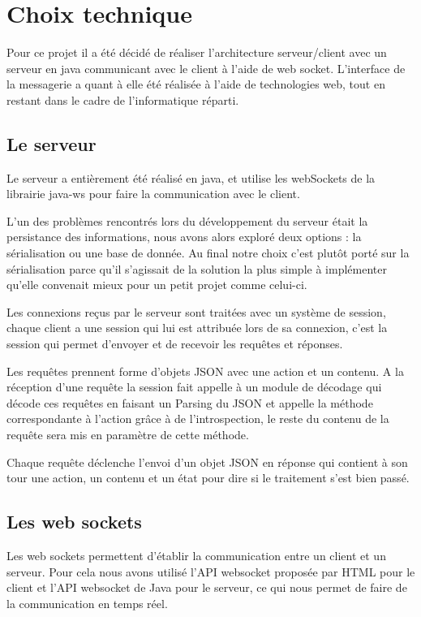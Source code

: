 \section{Choix technique}

\par Pour ce projet il a été décidé de réaliser l'architecture serveur/client avec un serveur en java communicant avec le client à l'aide de web socket. L’interface de la messagerie a quant à elle été réalisée à l'aide de technologies web, tout en restant dans le cadre de l'informatique réparti. 

\subsection{Le serveur}
\par Le serveur a entièrement été réalisé en java, et utilise les webSockets de la librairie java-ws pour faire la communication avec le client.
\par L'un des problèmes rencontrés lors du développement du serveur était la persistance des informations, nous avons alors exploré deux options : la sérialisation ou une base de donnée.
Au final notre choix c'est plutôt porté sur la sérialisation parce qu'il s'agissait de la solution la plus simple à implémenter qu'elle convenait mieux pour un petit projet comme celui-ci.
\par Les connexions reçus par le serveur sont traitées avec un système de session, chaque client a une session qui lui est attribuée lors de sa connexion, c'est la session qui permet d'envoyer et de recevoir les requêtes et réponses.
\par Les requêtes prennent forme d'objets JSON avec une action et un contenu. A la réception d'une requête la session fait appelle à un module de décodage qui décode ces requêtes en faisant un Parsing du JSON et appelle la méthode correspondante à l'action grâce à de l'introspection, le reste du contenu de la requête sera mis en paramètre de cette méthode.
\par Chaque requête déclenche l'envoi d'un objet JSON en réponse qui contient à son tour une action, un contenu et un état pour dire si le traitement s'est bien passé.

\subsection{Les web sockets}
\par Les web sockets permettent d'établir la communication entre un client et un serveur. Pour cela nous avons utilisé l'API websocket proposée par HTML pour le client 
et l'API websocket de Java pour le serveur, ce qui nous permet de faire de la communication en temps réel.

